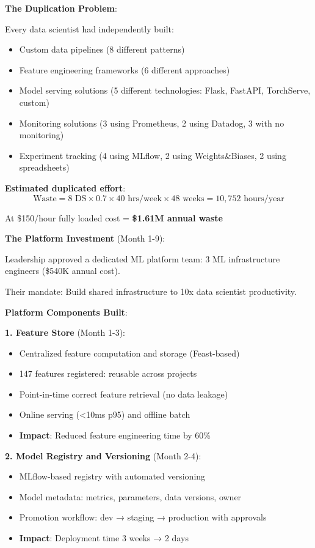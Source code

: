 \textbf{The Duplication Problem}:

Every data scientist had independently built:
\begin{itemize}
    \item Custom data pipelines (8 different patterns)
    \item Feature engineering frameworks (6 different approaches)
    \item Model serving solutions (5 different technologies: Flask, FastAPI, TorchServe, custom)
    \item Monitoring solutions (3 using Prometheus, 2 using Datadog, 3 with no monitoring)
    \item Experiment tracking (4 using MLflow, 2 using Weights\&Biases, 2 using spreadsheets)
\end{itemize}

\textbf{Estimated duplicated effort}:
\begin{equation}
\text{Waste} = 8 \text{ DS} \times 0.7 \times 40 \text{ hrs/week} \times 48 \text{ weeks} = 10,752 \text{ hours/year}
\end{equation}

At \$150/hour fully loaded cost = \textbf{\$1.61M annual waste}

\textbf{The Platform Investment} (Month 1-9):

Leadership approved a dedicated ML platform team: 3 ML infrastructure engineers (\$540K annual cost).

Their mandate: Build shared infrastructure to 10x data scientist productivity.

\textbf{Platform Components Built}:

\textbf{1. Feature Store} (Month 1-3):
\begin{itemize}
    \item Centralized feature computation and storage (Feast-based)
    \item 147 features registered: reusable across projects
    \item Point-in-time correct feature retrieval (no data leakage)
    \item Online serving (<10ms p95) and offline batch
    \item \textbf{Impact}: Reduced feature engineering time by 60\%
\end{itemize}

\textbf{2. Model Registry and Versioning} (Month 2-4):
\begin{itemize}
    \item MLflow-based registry with automated versioning
    \item Model metadata: metrics, parameters, data versions, owner
    \item Promotion workflow: dev → staging → production with approvals
    \item \textbf{Impact}: Deployment time 3 weeks → 2 days
\end{itemize}

